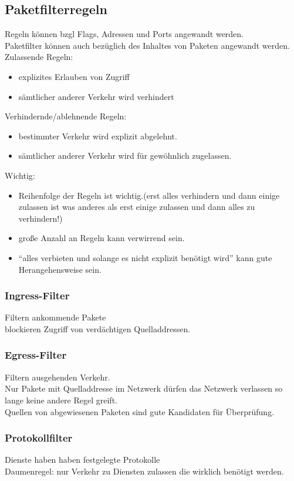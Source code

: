 \documentclass{article} %
\begin{document}
\subsection{Paketfilterregeln}
Regeln können bzgl Flags, Adressen und Ports angewandt werden.\\
Paketfilter können auch bezüglich des Inhaltes von Paketen angewandt werden.\\
Zulassende Regeln:
\begin{itemize}
	\item explizites Erlauben von Zugriff
    \item sämtlicher anderer Verkehr wird verhindert
\end{itemize}
Verhindernde/ablehnende Regeln:
\begin{itemize}
	\item bestimmter Verkehr wird explizit abgelehnt.
    \item sämtlicher anderer Verkehr wird für gewöhnlich zugelassen.
\end{itemize}
Wichtig:
\begin{itemize}
	\item Reihenfolge der Regeln ist wichtig.(erst alles verhindern und dann einige zulassen ist was anderes als erst einige zulassen und dann alles zu verhindern!)
    \item große Anzahl an Regeln kann verwirrend sein.
    \item "`alles verbieten und solange es nicht explizit benötigt wird"' kann gute Herangehensweise sein.
\end{itemize}
\subsubsection{Ingress-Filter}
Filtern ankommende Pakete\\
blockieren Zugriff von verdächtigen Quelladdressen.\\
 \subsubsection{Egress-Filter}
Filtern ausgehenden Verkehr.\\
Nur Pakete mit Quelladdresse im Netzwerk dürfen das Netzwerk verlassen so lange keine andere Regel greift.\\
Quellen von abgewiesenen Paketen sind gute Kandidaten für Überprüfung.\\
\subsubsection{Protokollfilter}
Dienste haben haben festgelegte Protokolle\\
Daumenregel: nur Verkehr zu Diensten zulassen die wirklich benötigt werden.\\
\end{document}

